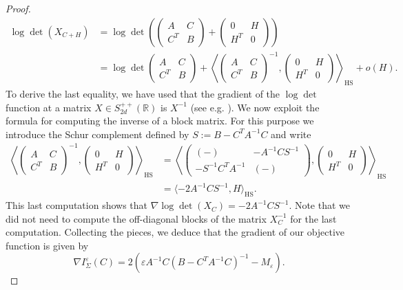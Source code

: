 \documentclass[]{article}
\DeclareMathOperator{\HS}{HS}
\numberwithin{equation}{section}
\theoremstyle{plain}
\begin{document}
\begin{proof}
\begin{align*}
    \log \det(X_{C+H}) & = \log \det \left(\begin{pmatrix}
        A & C \\
        C^T& B
    \end{pmatrix} + \begin{pmatrix}
        0 &  H \\
         H^T& 0
    \end{pmatrix} \right) \\
    & = \log \det \begin{pmatrix}
        A & C \\
        C^T& B
    \end{pmatrix} + \left\langle \begin{pmatrix}
        A & C \\
        C^T& B
    \end{pmatrix}^{-1},  \begin{pmatrix}
        0 &  H \\
         H^T& 0
    \end{pmatrix} \right\rangle_{\HS}  + o(H).
\end{align*}
To derive the last equality, we have used that the gradient of the $\log \det $ function at a matrix $X \in S_{2d}^{++}(\mathbb{R})$ is $X^{-1}$ (see e.g. \cite[p.~641]{boyd2004convex}). We now exploit the formula for computing the inverse of a block matrix. For this purpose we introduce the Schur complement defined by $S := B- C^TA^{-1}C$ and write 
\begin{align*}
    \left\langle \begin{pmatrix}
        A & C \\
        C^T& B
    \end{pmatrix}^{-1},  \begin{pmatrix}
        0 &  H \\
         H^T& 0
    \end{pmatrix} \right\rangle_{\HS} & =   \left\langle \begin{pmatrix}
        (-) & -A^{-1}CS^{-1} \\
        -S^{-1}C^TA^{-1} & (-)
    \end{pmatrix},  \begin{pmatrix}
        0 &  H \\
         H^T& 0
    \end{pmatrix} \right\rangle_{\HS} \\
    & = \langle -2A^{-1}C S^{-1}, H \rangle_{\HS}.
\end{align*}
This last computation shows that $\nabla \log \det(X_C) = -2A^{-1}C S^{-1}$.
Note that we did not need to compute the  off-diagonal blocks of the matrix $X_C^{-1}$ for the last computation. Collecting the pieces, we deduce that the gradient of our objective function is given by
\begin{equation}
    \nabla I_\Sigma^\varepsilon(C) = 2(\varepsilon A^{-1}C ( B- C^TA^{-1}C)^{-1}-M_\varepsilon).
\end{equation}
\end{proof}
\end{document}
